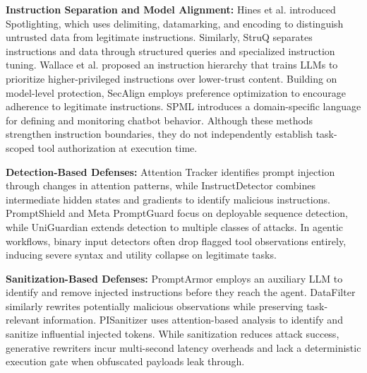 \documentclass[conference]{IEEEtran}
\begin{document}
\textbf{Instruction Separation and Model Alignment:} Hines et al. \cite{b5} introduced Spotlighting, which uses delimiting, datamarking, and encoding to distinguish untrusted data from legitimate instructions. Similarly, StruQ \cite{b6} separates instructions and data through structured queries and specialized instruction tuning. Wallace et al. \cite{b4} proposed an instruction hierarchy that trains LLMs to prioritize higher-privileged instructions over lower-trust content. Building on model-level protection, SecAlign \cite{b7} employs preference optimization to encourage adherence to legitimate instructions. SPML \cite{b15} introduces a domain-specific language for defining and monitoring chatbot behavior. Although these methods strengthen instruction boundaries, they do not independently establish task-scoped tool authorization at execution time.

\textbf{Detection-Based Defenses:} Attention Tracker \cite{b8} identifies prompt injection through changes in attention patterns, while InstructDetector \cite{b9} combines intermediate hidden states and gradients to identify malicious instructions. PromptShield and Meta PromptGuard \cite{b10} focus on deployable sequence detection, while UniGuardian \cite{b11} extends detection to multiple classes of attacks. In agentic workflows, binary input detectors often drop flagged tool observations entirely, inducing severe syntax and utility collapse on legitimate tasks.

\textbf{Sanitization-Based Defenses:} PromptArmor \cite{b12} employs an auxiliary LLM to identify and remove injected instructions before they reach the agent. DataFilter \cite{b13} similarly rewrites potentially malicious observations while preserving task-relevant information. PISanitizer \cite{b14} uses attention-based analysis to identify and sanitize influential injected tokens. While sanitization reduces attack success, generative rewriters incur multi-second latency overheads and lack a deterministic execution gate when obfuscated payloads leak through.
\end{document}
